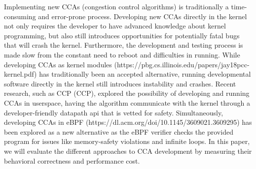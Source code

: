 \documentclass[../main.tex]{subfiles}
\begin{document}
Implementing new CCAs (congestion control algorithms) is traditionally a time-consuming and error-prone process. Developing new CCAs directly in the kernel not only requires the developer to have advanced knowledge about kernel programming, but also still introduces opportunities for potentially fatal bugs that will crash the kernel. Furthermore, the development and testing process is made slow from the constant need to reboot and difficulties in running. While developing CCAs as kernel modules (https://pbg.cs.illinois.edu/papers/jay18pcc-kernel.pdf) has traditionally been an accepted alternative, running developmental software directly in the kernel still introduces instability and crashes. Recent research, such as CCP (CCP), explored the possibility of developing and running CCAs in userspace, having the algorithm communicate with the kernel through a developer-friendly datapath api that is vetted for safety. Simultaneously, developing CCAs in eBPF (https://dl.acm.org/doi/10.1145/3609021.3609295) has been explored as a new alternative as the eBPF verifier checks the provided program for issues like memory-safety violations and infinite loops. In this paper, we will evaluate the different approaches to CCA development by measuring their behavioral correctness and performance cost. 
\end{document}
